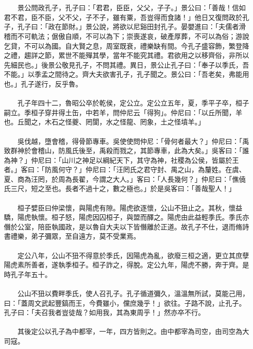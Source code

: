 \\\\
　　景公問政孔子，孔子曰：「君君，臣臣，父父，子子。」景公曰：「善哉！信如君不君，臣不臣，父不父，子不子，雖有粟，吾豈得而食諸！」他日又復問政於孔子，孔子曰：「政在節財。」景公說，將欲以尼谿田封孔子。晏嬰進曰：「夫儒者滑稽而不可軌法；倨傲自順，不可以為下；崇喪遂哀，破產厚葬，不可以為俗；游說乞貸，不可以為國。自大賢之息，周室既衰，禮樂缺有間。今孔子盛容飾，繁登降之禮，趨詳之節，累世不能殫其學，當年不能究其禮。君欲用之以移齊俗，非所以先細民也。」後景公敬見孔子，不問其禮。異日，景公止孔子曰：「奉子以季氏，吾不能。」以季孟之間待之。齊大夫欲害孔子，孔子聞之。景公曰：「吾老矣，弗能用也。」孔子遂行，反乎魯。
\\\\
　　孔子年四十二，魯昭公卒於乾侯，定公立。定公立五年，夏，季平子卒，桓子嗣立。季桓子穿井得土缶，中若羊，問仲尼云「得狗」。仲尼曰：「以丘所聞，羊也。丘聞之，木石之怪夔、罔閬，水之怪龍、罔象，土之怪墳羊。」
\\\\
　　吳伐越，墮會稽，得骨節專車。吳使使問仲尼：「骨何者最大？」仲尼曰：「禹致群神於會稽山，防風氏後至，禹殺而戮之，其節專車，此為大矣。」吳客曰：「誰為神？」仲尼曰：「山川之神足以綱紀天下，其守為神，社稷為公侯，皆屬於王者。」客曰：「防風何守？」仲尼曰：「汪罔氏之君守封、禺之山，為釐姓。在虞、夏、商為汪罔，於周為長翟，今謂之大人。」客曰：「人長幾何？」仲尼曰：「僬僥氏三尺，短之至也。長者不過十之，數之極也。」於是吳客曰：「善哉聖人！」
\\\\
　　桓子嬖臣曰仲梁懷，與陽虎有隙。陽虎欲逐懷，公山不狃止之。其秋，懷益驕，陽虎執懷。桓子怒，陽虎因囚桓子，與盟而醳之。陽虎由此益輕季氏。季氏亦僭於公室，陪臣執國政，是以魯自大夫以下皆僭離於正道。故孔子不仕，退而脩詩書禮樂，弟子彌眾，至自遠方，莫不受業焉。
\\\\
　　定公八年，公山不狃不得意於季氏，因陽虎為亂，欲廢三桓之適，更立其庶孽陽虎素所善者，遂執季桓子。桓子詐之，得脫。定公九年，陽虎不勝，奔于齊。是時孔子年五十。
\\\\
　　公山不狃以費畔季氏，使人召孔子。孔子循道彌久，溫溫無所試，莫能己用，曰：「蓋周文武起豐鎬而王，今費雖小，儻庶幾乎！」欲往。子路不說，止孔子。孔子曰：「夫召我者豈徒哉？如用我，其為東周乎！」然亦卒不行。
\\\\
　　其後定公以孔子為中都宰，一年，四方皆則之。由中都宰為司空，由司空為大司寇。
\\\\
